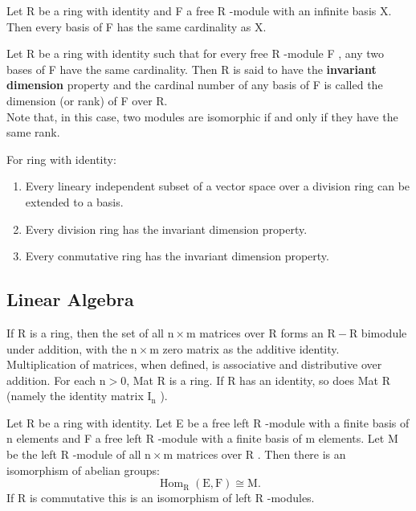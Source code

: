\begin{theo}
        Let R be a ring with identity and F a free R -module with an infinite basis X. Then every basis of F has the same cardinality as X.
\end{theo}

Let R be a ring with identity such that for every free R -module F , any two bases of F have the same cardinality. Then R is said to have the \textbf{invariant dimension} property and the cardinal number of any basis of F is called the dimension (or rank) of F over R. \\
Note that, in this case, two modules are isomorphic if and only if they have the same rank.\\

\begin{theo} For ring with identity:
    \begin{enumerate}
        \item Every lineary independent subset of a vector space over a division ring can be extended to a basis.
        \item Every division ring has the invariant dimension property.
        \item Every conmutative ring has the invariant dimension property.
    \end{enumerate}
    \end{theo}

\subsection*{Linear Algebra}

If R is a ring, then the set of all $\mathrm{n} \times \mathrm{m}$ matrices over R forms an $\mathrm{R}-\mathrm{R}$ bimodule under addition, with the $\mathrm{n} \times \mathrm{m}$ zero matrix as the additive identity. Multiplication of matrices, when defined, is associative and distributive over addition. For each $\mathrm{n}>0$, Mat R is a ring. If R has an identity, so does Mat R (namely the identity matrix $\mathrm{I}_{\mathrm{n}}$ ).

\begin{theo}
Let R be a ring with identity. Let E be a free left R -module with a finite basis of n elements and F a free left R -module with a finite basis of m elements. Let M be the left R -module of all $\mathrm{n} \times \mathrm{m}$ matrices over R . Then there is an isomorphism of abelian groups:
$$
\operatorname{Hom}_{\mathrm{R}}(\mathrm{E}, \mathrm{F}) \cong \mathrm{M} .
$$
If R is commutative this is an isomorphism of left R -modules.
\end{theo}

